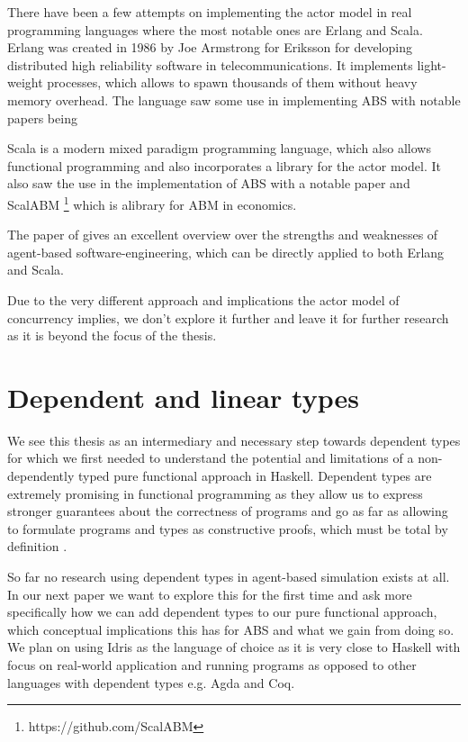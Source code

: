 There have been a few attempts on implementing the actor model in real programming languages where the most notable ones are Erlang and Scala. Erlang was created in 1986 by Joe Armstrong for Eriksson for developing distributed high reliability software in telecommunications. It implements light-weight processes, which allows to spawn thousands of them without heavy memory overhead. The language saw some use in implementing ABS with notable papers being \cite{di_stefano_using_2005, di_stefano_exat:_2007, varela_modelling_2004, sher_agent-based_2013, bezirgiannis_improving_2013}

Scala is a modern mixed paradigm programming language, which also allows functional programming and also incorporates a library for the actor model. It also saw the use in the implementation of ABS with a notable paper \cite{krzywicki_massively_2015} and ScalABM \footnote{https://github.com/ScalABM} which is alibrary for ABM in economics.

The paper of \cite{jennings_agent-based_2000} gives an excellent overview over the strengths and weaknesses of agent-based software-engineering, which can be directly applied to both Erlang and Scala.

Due to the very different approach and implications the actor model of concurrency implies, we don't explore it further and leave it for further research as it is beyond the focus of the thesis.

\section{Dependent and linear types}
We see this thesis as an intermediary and necessary step towards dependent types for which we first needed to understand the potential and limitations of a non-dependently typed pure functional approach in Haskell. Dependent types are extremely promising in functional programming as they allow us to express stronger guarantees about the correctness of programs and go as far as allowing to formulate programs and types as constructive proofs, which must be total by definition \cite{thompson_type_1991, mckinna_why_2006, altenkirch_pi_2010}.

So far no research using dependent types in agent-based simulation exists at all. In our next paper we want to explore this for the first time and ask more specifically how we can add dependent types to our pure functional approach, which conceptual implications this has for ABS and what we gain from doing so. We plan on using Idris \cite{brady_idris_2013} as the language of choice as it is very close to Haskell with focus on real-world application and running programs as opposed to other languages with dependent types e.g. Agda and Coq.

